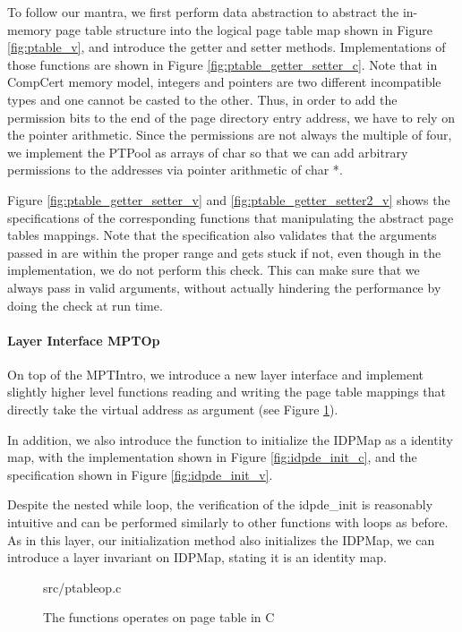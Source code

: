 To follow our mantra, we first perform data abstraction to abstract the in-memory
page table structure into the logical page table map shown in Figure \ref{fig:ptable_v},
and introduce the getter and setter methods.
Implementations of those functions are shown in Figure \ref{fig:ptable_getter_setter_c}.
Note that in CompCert memory model, integers and pointers are two different incompatible
types and one cannot be casted to the other. Thus, in order to add the permission bits
to the end of the page directory entry address, we have to rely on the pointer arithmetic.
Since the permissions are not always the multiple of four, we implement the \textsf{PTPool}
as arrays of \textsf{char} so that we can add arbitrary permissions to the addresses via
pointer arithmetic of \textsf{char *}.

Figure \ref{fig:ptable_getter_setter_v} and \ref{fig:ptable_getter_setter2_v} shows the
specifications of the corresponding functions that manipulating the abstract page tables mappings.
Note that the specification also validates that the arguments passed in are within the proper range
and gets stuck if not, even though in the implementation, we do not perform this check.
This can make sure that we always pass in valid arguments, without actually hindering the performance
by doing the check at run time.

\paragraph{Layer Interface MPTOp}

On top of the MPTIntro, we introduce a new layer interface and implement
slightly higher level functions reading and writing the page table mappings that directly
take the virtual address as argument (see Figure \ref{fig:ptable_op_c}).

In addition, we also introduce the function to initialize the \textsf{IDPMap} as a identity map,
with the implementation shown in Figure \ref{fig:idpde_init_c}, and the specification shown
in Figure \ref{fig:idpde_init_v}.

Despite the nested while loop, the verification of the \textsf{idpde\_init} is reasonably
intuitive and can be performed similarly to other functions with loops as before.
As in this layer, our initialization method also initializes the \textsf{IDPMap}, we can
introduce a layer invariant on \textsf{IDPMap}, stating it is an identity map.

\begin{figure}
	 {src/ptableop.c}
	\caption{The functions operates on page table in C}
	\label{fig:ptable_op_c}
\end{figure}



